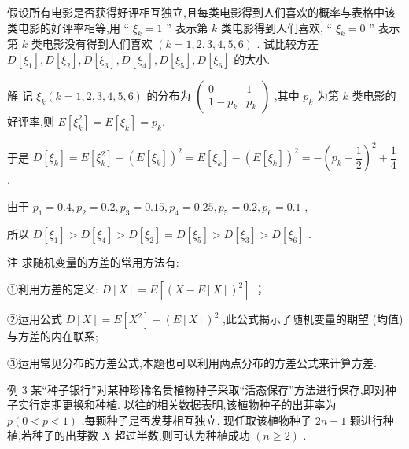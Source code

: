假设所有电影是否获得好评相互独立,且每类电影得到人们喜欢的概率与表格中该类电影的好评率相等,用 “ ${\xi }_{k} = 1$ ” 表示第 $k$ 类电影得到人们喜欢, “ ${\xi }_{k} = 0$ ” 表示第 $k$ 类电影没有得到人们喜欢 $\left( {k = 1,2,3,4,5,6}\right)$ . 试比较方差 $D\left\lbrack  {\xi }_{1}\right\rbrack  ,D\left\lbrack  {\xi }_{2}\right\rbrack  ,D\left\lbrack  {\xi }_{3}\right\rbrack  ,D\left\lbrack  {\xi }_{4}\right\rbrack  ,D\left\lbrack  {\xi }_{5}\right\rbrack  ,D\left\lbrack  {\xi }_{6}\right\rbrack$ 的大小.

解 记 ${\xi }_{k}\left( {k = 1,2,3,4,5,6}\right)$ 的分布为 $\left( \begin{matrix} 0 & 1 \\  1 - {p}_{k} & {p}_{k} \end{matrix}\right)$ ,其中 ${p}_{k}$ 为第 $k$ 类电影的好评率,则 $E\left\lbrack  {\xi }_{k}^{2}\right\rbrack   = E\left\lbrack  {\xi }_{k}\right\rbrack   = {p}_{k}.$

于是 $D\left\lbrack  {\xi }_{k}\right\rbrack   = E\left\lbrack  {\xi }_{k}^{2}\right\rbrack   - {\left( E\left\lbrack  {\xi }_{k}\right\rbrack  \right) }^{2} = E\left\lbrack  {\xi }_{k}\right\rbrack   - {\left( E\left\lbrack  {\xi }_{k}\right\rbrack  \right) }^{2} =  - {\left( {p}_{k} - \dfrac{1}{2}\right) }^{2} + \dfrac{1}{4}$ .

由于 ${p}_{1} = {0.4},{p}_{2} = {0.2},{p}_{3} = {0.15},{p}_{4} = {0.25},{p}_{5} = {0.2},{p}_{6} = {0.1}$ ,

所以 $D\left\lbrack  {\xi }_{1}\right\rbrack   > D\left\lbrack  {\xi }_{4}\right\rbrack   > D\left\lbrack  {\xi }_{2}\right\rbrack   = D\left\lbrack  {\xi }_{5}\right\rbrack   > D\left\lbrack  {\xi }_{3}\right\rbrack   > D\left\lbrack  {\xi }_{6}\right\rbrack$ .

注 求随机变量的方差的常用方法有:

①利用方差的定义: $D\left\lbrack  X\right\rbrack   = E\left\lbrack  {\left( X - E\left\lbrack  X\right\rbrack  \right) }^{2}\right\rbrack$ ；

②运用公式 $D\left\lbrack  X\right\rbrack   = E\left\lbrack  {X}^{2}\right\rbrack   - {\left( E\left\lbrack  X\right\rbrack  \right) }^{2}$ ,此公式揭示了随机变量的期望 (均值) 与方差的内在联系;

③运用常见分布的方差公式,本题也可以利用两点分布的方差公式来计算方差.

例 3 某“种子银行”对某种珍稀名贵植物种子采取“活态保存”方法进行保存,即对种子实行定期更换和种植. 以往的相关数据表明,该植物种子的出芽率为 $p\left( {0 < p < 1}\right)$ ,每颗种子是否发芽相互独立. 现任取该植物种子 ${2n} - 1$ 颗进行种植,若种子的出芽数 $X$ 超过半数,则可认为种植成功 $\left( {n \geq  2}\right)$ .

